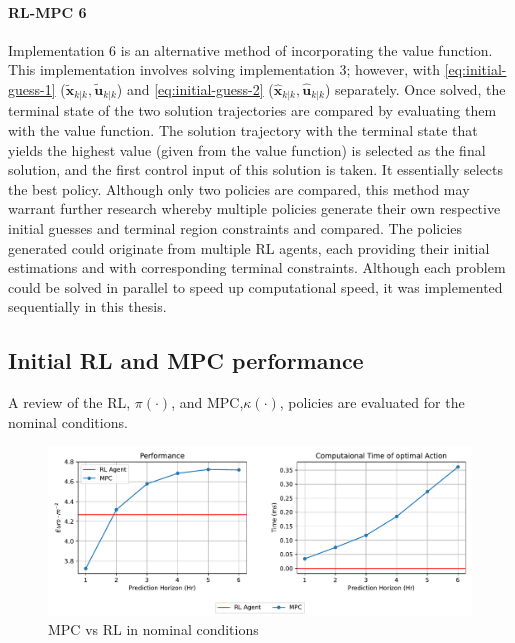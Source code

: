 \paragraph{RL-MPC 6}
Implementation 6 is an alternative method of incorporating the value function. This implementation involves solving implementation 3; however, with \autoref{eq:initial-guess-1} ($\tilde{\mathbf{x}}_{k|k},\tilde{\mathbf{u}}_{k|k}$) and \autoref{eq:initial-guess-2} ($\hat{\mathbf{x}}_{k|k},\hat{\mathbf{u}}_{k|k}$) separately. Once solved, the terminal state of the two solution trajectories are compared by evaluating them with the value function. The solution trajectory with the terminal state that yields the highest value (given from the value function) is selected as the final solution, and the first control input of this solution is taken. It essentially selects the best policy. Although only two policies are compared, this method may warrant further research whereby multiple policies generate their own respective initial guesses and terminal region constraints and compared. The policies generated could originate from multiple RL agents, each providing their initial estimations and with corresponding terminal constraints. Although each problem could be solved in parallel to speed up computational speed, it was implemented sequentially in this thesis.



\subsection{Initial RL and MPC performance}
A review of the RL, $\pi(\cdot)$, and MPC,$\kappa(\cdot)$, policies are evaluated for the nominal conditions.


\begin{figure}[H]
	\centering
	\includegraphics[width=\textwidth]{figures/mpc_vs_rl_nominal.pdf}
	\caption{MPC vs RL in nominal conditions}
	\label{fig:rl-vs-mpc-nominal}
\end{figure}


